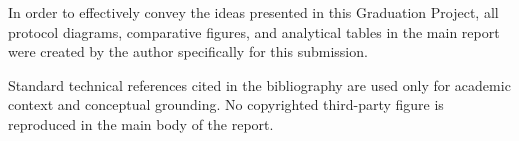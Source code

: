 In order to effectively convey the ideas presented in this Graduation Project,
all protocol diagrams, comparative figures, and analytical tables in the main
report were created by the author specifically for this submission.

Standard technical references cited in the bibliography are used only for
academic context and conceptual grounding. No copyrighted third-party figure is
reproduced in the main body of the report.
